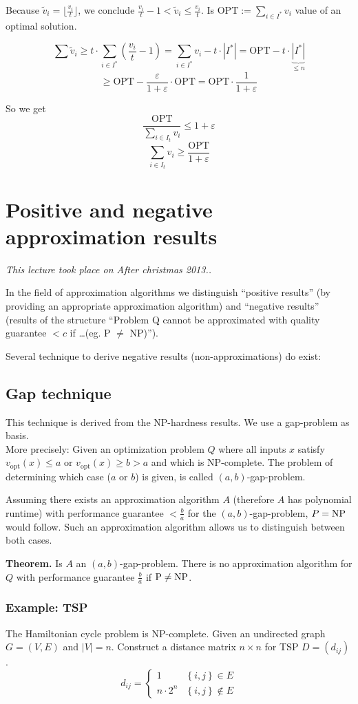 \documentclass[a4paper]{article}
\newcommand{\cls}[1]{\rm{#1}}
\newcommand{\set}[1]{\left\{#1\right\}}
\newcommand{\dateref}[1]{\emph{This lecture took place on #1.}\par}
\begin{document}
Because $\tilde v_i = \lfloor \frac{v_i}{t} \rfloor$, we conclude
$\frac{v_i}{t} - 1 < \tilde v_i \leq \frac{v_i}{t}$.
Is $\text{OPT} := \sum_{i \in I^*} v_i$ value of an optimal solution.

\[
  \sum \tilde v_i \geq t \cdot \sum_{i \in I^*} (\frac{v_i}{t} - 1)
    = \sum_{i \in I^*} v_i - t \cdot |I^*|
    = \text{OPT} - t \cdot \underbrace{|I^*|}_{\leq n}
\] \[
  \geq \text{OPT} - \frac{\varepsilon}{1 + \varepsilon} \cdot \text{OPT}
    = \text{OPT} \cdot \frac{1}{1 + \varepsilon}
\]

So we get
\[
  \frac{\text{OPT}}{\sum_{i \in I_t} v_i} \leq 1 + \varepsilon
\] \[
  \sum_{i \in I_t} v_i \geq \frac{\text{OPT}}{1 + \varepsilon}
\]

\section{Positive and negative approximation results}
\dateref{After christmas 2013.}
%
In the field of approximation algorithms we distinguish ``positive results''
(by providing an appropriate approximation algorithm) and ``negative results''
(results of the structure ``Problem Q cannot be approximated with quality guarantee
$< c$ if \dots (eg. P $\neq$ \cls{NP})'').

Several technique to derive negative results (non-approximations) do exist:

\subsection{Gap technique}
%
This technique is derived from the \cls{NP}-hardness results.
We use a gap-problem as basis. \\
More precisely: Given an optimization problem $Q$ where all inputs $x$ satisfy
$v_{\text{opt}}(x) \leq a$ or $v_{\text{opt}}(x) \geq b > a$ and which
is \cls{NP}-complete. The problem of determining which case ($a$ or $b$) is given,
is called $(a, b)$-gap-problem.

Assuming there exists an approximation algorithm $A$ (therefore $A$ has
polynomial runtime) with performance guarantee $< \frac{b}{a}$ for the
$(a, b)$-gap-problem, $P = \cls{NP}$ would follow. Such an approximation algorithm
allows us to distinguish between both cases.

\textbf{Theorem.}
Is $A$ an $(a, b)$-gap-problem. There is no approximation algorithm for $Q$
with performance guarantee $\frac{b}{a}$ if $\cls{P} \neq \cls{NP}$.

\subsubsection{Example: TSP}
%
The Hamiltonian cycle problem is \cls{NP}-complete. Given an undirected graph
$G = (V, E)$ and $|V| = n$. Construct a distance matrix $n\times n$ for TSP
$D = (d_{ij})$.
\[
  d_{ij} = \begin{cases}
    1 & \set{i,j} \in E \\
    n\cdot2^n & \set{i,j} \notin E
  \end{cases}
\]
\end{document}
